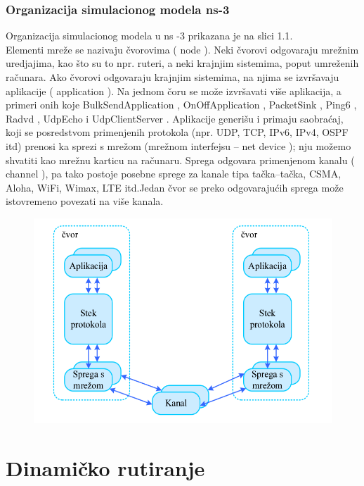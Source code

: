 \documentclass[a4paper,12pt, Projekat]{etf}
\begin{document}
\subsection{Organizacija simulacionog modela ns-3}
Organizacija simulacionog modela u ns -3 prikazana je na slici 1.1\label{fig:organizacija}.\\
Elementi mre\v ze se nazivaju \v cvorovima ( node ). Neki \v cvorovi odgovaraju mre\v znim uredjajima, kao \v sto su to npr. ruteri, a neki krajnjim sistemima, poput umre\v zenih ra\v cunara.
Ako \v cvorovi odgovaraju krajnjim sistemima, na njima se izvr\v savaju aplikacije
( application ). Na jednom \v coru se mo\v ze izvr\v savati vi\v se aplikacija, a primeri onih koje
BulkSendApplication , OnOffApplication , PacketSink , Ping6 ,
Radvd , UdpEcho i UdpClientServer . Aplikacije generi\v su i primaju saobra\' caj, koji se posredstvom primenjenih protokola (npr. UDP, TCP, IPv6, IPv4, OSPF itd) prenosi ka
sprezi s mre\v zom (mre\v znom interfejsu -- net device );
nju mo\v zemo shvatiti kao mre\v znu
karticu na ra\v cunaru. Sprega odgovara primenjenom kanalu ( channel ), pa tako postoje
posebne sprege za kanale tipa ta\v cka--ta\v cka, CSMA, Aloha, WiFi, Wimax, LTE itd.Jedan \v cvor se preko odgovaraju\' cih sprega mo\v ze istovremeno povezati na vi\v se kanala.
\begin{figure}[htb]
\centering
\includegraphics[width=.7\textwidth]{slike/nov.png}
\caption{}
\label{fig:organizacija}
\end{figure}
\chapter{Dinami\v cko rutiranje}
\end{document}
